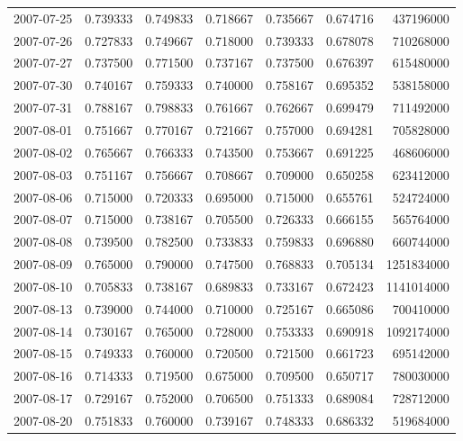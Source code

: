 \begin{tabular}{lrrrrrr}
2007-07-25 &    0.739333 &    0.749833 &    0.718667 &    0.735667 &    0.674716 &   437196000 \\
2007-07-26 &    0.727833 &    0.749667 &    0.718000 &    0.739333 &    0.678078 &   710268000 \\
2007-07-27 &    0.737500 &    0.771500 &    0.737167 &    0.737500 &    0.676397 &   615480000 \\
2007-07-30 &    0.740167 &    0.759333 &    0.740000 &    0.758167 &    0.695352 &   538158000 \\
2007-07-31 &    0.788167 &    0.798833 &    0.761667 &    0.762667 &    0.699479 &   711492000 \\
2007-08-01 &    0.751667 &    0.770167 &    0.721667 &    0.757000 &    0.694281 &   705828000 \\
2007-08-02 &    0.765667 &    0.766333 &    0.743500 &    0.753667 &    0.691225 &   468606000 \\
2007-08-03 &    0.751167 &    0.756667 &    0.708667 &    0.709000 &    0.650258 &   623412000 \\
2007-08-06 &    0.715000 &    0.720333 &    0.695000 &    0.715000 &    0.655761 &   524724000 \\
2007-08-07 &    0.715000 &    0.738167 &    0.705500 &    0.726333 &    0.666155 &   565764000 \\
2007-08-08 &    0.739500 &    0.782500 &    0.733833 &    0.759833 &    0.696880 &   660744000 \\
2007-08-09 &    0.765000 &    0.790000 &    0.747500 &    0.768833 &    0.705134 &  1251834000 \\
2007-08-10 &    0.705833 &    0.738167 &    0.689833 &    0.733167 &    0.672423 &  1141014000 \\
2007-08-13 &    0.739000 &    0.744000 &    0.710000 &    0.725167 &    0.665086 &   700410000 \\
2007-08-14 &    0.730167 &    0.765000 &    0.728000 &    0.753333 &    0.690918 &  1092174000 \\
2007-08-15 &    0.749333 &    0.760000 &    0.720500 &    0.721500 &    0.661723 &   695142000 \\
2007-08-16 &    0.714333 &    0.719500 &    0.675000 &    0.709500 &    0.650717 &   780030000 \\
2007-08-17 &    0.729167 &    0.752000 &    0.706500 &    0.751333 &    0.689084 &   728712000 \\
2007-08-20 &    0.751833 &    0.760000 &    0.739167 &    0.748333 &    0.686332 &   519684000 \\

\end{tabular}

